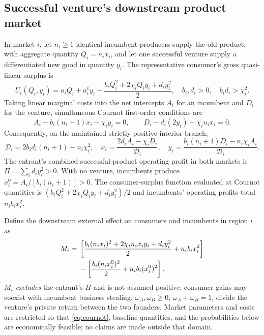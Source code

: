 \subsection{Successful venture's downstream product market}
In market $i$, let $n_i\geq1$ identical incumbent producers supply the old product, with aggregate quantity $Q_i=n_i x_i$, and let one successful venture supply a differentiated new good in quantity $y_i$. The representative consumer's gross quasi-linear surplus is
\begin{equation}
 U_i(Q_i,y_i)=a_iQ_i+a_i^v y_i-
 \frac{b_iQ_i^2+2\chi_iQ_iy_i+d_iy_i^2}{2},
 \quad b_i,d_i>0,\quad b_id_i>\chi_i^2.
 \label{eq:utility}
\end{equation}
Taking linear marginal costs into the net intercepts $A_i$ for an incumbent and $D_i$ for the venture, simultaneous Cournot first-order conditions are
\begin{equation}
 A_i-b_i(n_i+1)x_i-\chi_i y_i=0,\qquad
 D_i-d_i(2y_i)-\chi_i n_i x_i=0.
 \label{eq:cournot-foc}
\end{equation}
Consequently, on the maintained strictly positive interior branch,
\begin{equation}
 \mathcal D_i=2b_id_i(n_i+1)-n_i\chi_i^2,\quad
 x_i=\frac{2d_iA_i-\chi_iD_i}{\mathcal D_i},\quad
 y_i=\frac{b_i(n_i+1)D_i-n_i\chi_iA_i}{\mathcal D_i}.
 \label{eq:cournot}
\end{equation}
The entrant's combined successful-product operating profit in both markets is $\Pi=\sum_i d_i y_i^2>0$. With no venture, incumbents produce $x_i^0=A_i/[b_i(n_i+1)]>0$. The consumer-surplus function evaluated at Cournot quantities is $(b_i Q_i^2+2\chi_iQ_iy_i+d_iy_i^2)/2$ and incumbents' operating profits total $n_i b_i x_i^2$.

Define the downstream external effect on consumers and incumbents in region $i$ as
\begin{align}
 M_i={}&
 \left[\frac{b_i(n_ix_i)^2+2\chi_i n_ix_iy_i+d_i y_i^2}{2}
 +n_i b_i x_i^2\right]\notag\\
 &-\left[\frac{b_i(n_ix_i^0)^2}{2}+n_i b_i(x_i^0)^2\right].
 \label{eq:Mi}
\end{align}
$M_i$ \emph{excludes} the entrant's $\Pi$ and is not assumed positive: consumer gains may coexist with incumbent business stealing. $\omega_A,\omega_B\geq0$, $\omega_A+\omega_B=1$, divide the venture's private return between the two founders. Market parameters and costs are restricted so that \eqref{eq:cournot}, baseline quantities, and the probabilities below are economically feasible; no claims are made outside that domain.

